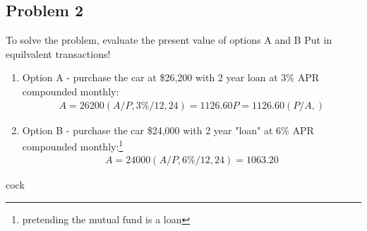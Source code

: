 \documentclass{report} %
\begin{document}
\subsection*{Problem 2} 
To solve the problem, evaluate the present value of options A and B 
Put in equilvalent transactions!
\begin{enumerate}
    \item Option A - purchase the car at \$26,200 with 2 year loan at 3\% APR compounded monthly: 
    \begin{equation*}
        \begin{aligned}
            A = 26200(A/P,3\%/12,24) = 1126.60
            P = 1126.60(P/A,)
        \end{aligned}
    \end{equation*}
    \item Option B - purchase the car \$24,000 with 2 year "loan" at 6\% APR compounded monthly:\footnote{pretending the mutual fund is a loan}
    \begin{equation*}
        \begin{aligned}
            A = 24000(A/P,6\%/12,24) = 1063.20
        \end{aligned}
    \end{equation*}
\end{enumerate}

cock
\end{document}
